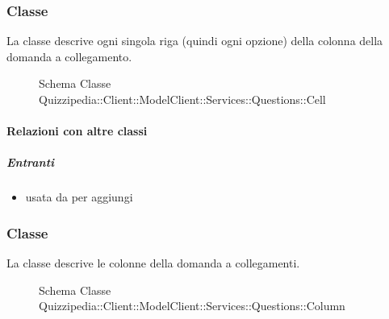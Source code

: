 \subsubsection{Classe }
La classe descrive ogni singola riga (quindi ogni opzione) della colonna della domanda a collegamento.
\begin{figure}[H]
\centering
\noindent{}
\caption[Schema Classe Cell]{Schema Classe Quizzipedia::Client::ModelClient::Services::Questions::Cell}
\end{figure}
\paragraph{Relazioni con altre classi}
\subparagraph{Entranti}
\begin{itemize}
\item usata da  per aggiungi
\end{itemize}
\subsubsection{Classe }
La classe descrive le colonne della domanda a collegamenti.
\begin{figure}[H]
\centering
\noindent{}
\caption[Schema Classe Column]{Schema Classe Quizzipedia::Client::ModelClient::Services::Questions::Column}
\end{figure}
